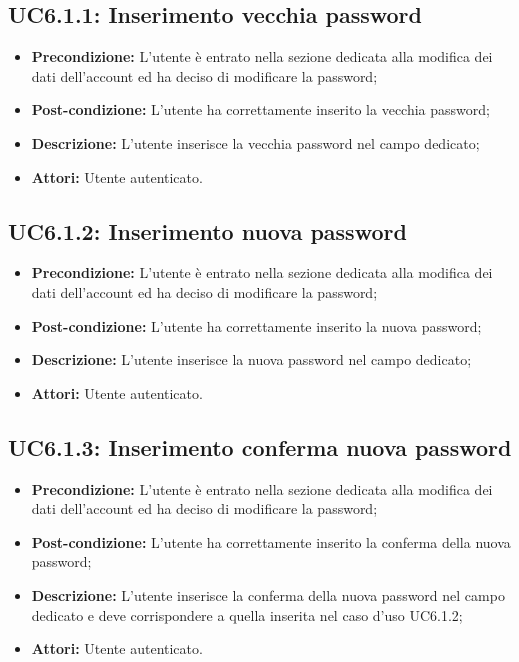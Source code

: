 \subsection{ UC6.1.1: Inserimento vecchia password}

\begin{itemize}
	\item \textbf{Precondizione:} L’utente è entrato nella sezione dedicata alla modifica dei dati dell’account ed ha deciso di modificare la password;
	\item \textbf{Post-condizione:} L’utente ha correttamente inserito la vecchia password;
	\item \textbf{Descrizione:} L’utente inserisce la vecchia password nel campo dedicato;
	\item \textbf{Attori:} Utente autenticato.
\end{itemize}
\subsection{ UC6.1.2: Inserimento nuova password}

\begin{itemize}
	\item \textbf{Precondizione:} L’utente è entrato nella sezione dedicata alla modifica dei dati dell’account ed ha deciso di modificare la password;
	\item \textbf{Post-condizione:}  L’utente ha correttamente inserito la nuova password;
	\item \textbf{Descrizione:} L’utente inserisce la nuova password nel campo dedicato;
	\item \textbf{Attori:} Utente autenticato.
\end{itemize}
\subsection{ UC6.1.3: Inserimento conferma nuova password}

\begin{itemize}
	\item \textbf{Precondizione:} L’utente è entrato nella sezione dedicata alla modifica dei dati dell’account ed ha deciso di modificare la password;
	\item \textbf{Post-condizione:} L’utente ha correttamente inserito la conferma della nuova password;
	\item \textbf{Descrizione:} L’utente inserisce la conferma della nuova password nel campo dedicato e deve corrispondere a quella inserita nel caso d’uso UC6.1.2;
	\item \textbf{Attori:} Utente autenticato.
\end{itemize}
